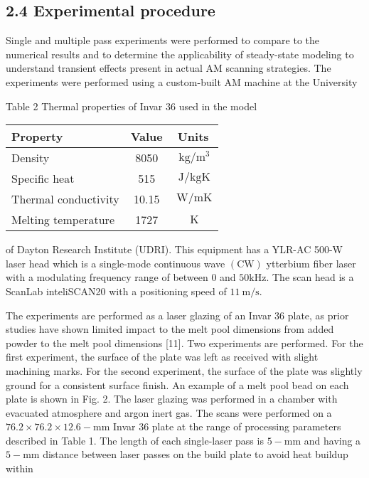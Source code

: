 \documentclass[10pt]{article}
\begin{document}
\subsection*{2.4 Experimental procedure}
Single and multiple pass experiments were performed to compare to the numerical results and to determine the applicability of steady-state modeling to understand transient effects present in actual AM scanning strategies. The experiments were performed using a custom-built AM machine at the University

Table 2 Thermal properties of Invar 36 used in the model

\begin{center}
\begin{tabular}{lcc}
\hline
Property & Value & Units \\
\hline
Density & 8050 & $\mathrm{~kg} / \mathrm{m}^{3}$ \\
Specific heat & 515 & $\mathrm{~J} / \mathrm{kgK}$ \\
Thermal conductivity & 10.15 & $\mathrm{~W} / \mathrm{mK}$ \\
Melting temperature & 1727 & $\mathrm{~K}$ \\
\hline
\end{tabular}
\end{center}

of Dayton Research Institute (UDRI). This equipment has a YLR-AC 500-W laser head which is a single-mode continuous wave $(\mathrm{CW})$ ytterbium fiber laser with a modulating frequency range of between 0 and $50 \mathrm{kHz}$. The scan head is a ScanLab inteliSCAN20 with a positioning speed of $11 \mathrm{~m} / \mathrm{s}$.

The experiments are performed as a laser glazing of an Invar 36 plate, as prior studies have shown limited impact to the melt pool dimensions from added powder to the melt pool dimensions [11]. Two experiments are performed. For the first experiment, the surface of the plate was left as received with slight machining marks. For the second experiment, the surface of the plate was slightly ground for a consistent surface finish. An example of a melt pool bead on each plate is shown in Fig. 2. The laser glazing was performed in a chamber with evacuated atmosphere and argon inert gas. The scans were performed on a $76.2 \times 76.2 \times 12.6-\mathrm{mm}$ Invar 36 plate at the range of processing parameters described in Table 1. The length of each single-laser pass is $5-\mathrm{mm}$ and having a $5-\mathrm{mm}$ distance between laser passes on the build plate to avoid heat buildup within
\end{document}
